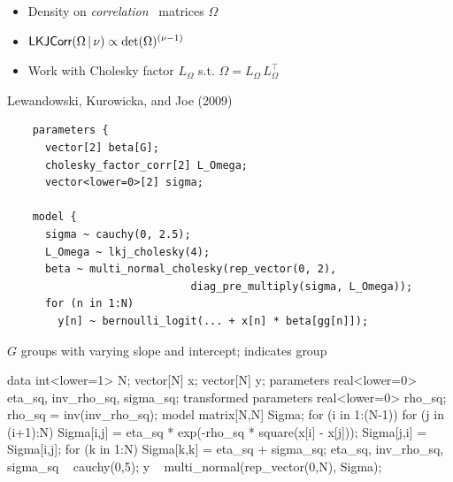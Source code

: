 \documentclass[10pt]{report}
\begin{document}
%
\begin{itemize}
\item Density on \emph{correlation} \ matrices $\Omega$
%
\item $\text{\sf LKJCorr}(\Omega \, | \, \nu)
       \propto \mbox{det}(\Omega)^{(\nu - 1)}$
%
\item Work with Cholesky factor $L_{\Omega}$ s.t. $\Omega = L_{\Omega} \, L_{\Omega}^{\top}$
%
\end{itemize}
\vfill
\hfill {\footnotesize Lewandowski, Kurowicka, and Joe (2009)}


%
\vspace*{-4pt}
{\footnotesize
\begin{Verbatim}
    parameters {
      vector[2] beta[G];
      cholesky_factor_corr[2] L_Omega;
      vector<lower=0>[2] sigma;

    model {
      sigma ~ cauchy(0, 2.5);
      L_Omega ~ lkj_cholesky(4);
      beta ~ multi_normal_cholesky(rep_vector(0, 2),
                             diag_pre_multiply(sigma, L_Omega));
      for (n in 1:N)
        y[n] ~ bernoulli_logit(... + x[n] * beta[gg[n]]);
\end{Verbatim}
}
\vspace*{6pt}
\begin{subitemize}
\item $G$ groups with varying slope and intercept;  indicates group
\end{subitemize}


%
\vspace*{-5pt}
\begin{stancode}
data {
  int<lower=1> N;  vector[N] x; vector[N] y;
} parameters {
  real<lower=0> eta_sq, inv_rho_sq, sigma_sq;
} transformed parameters {
  real<lower=0> rho_sq; rho_sq = inv(inv_rho_sq);
} model {
  matrix[N,N] Sigma;
  for (i in 1:(N-1)) {
    for (j in (i+1):N) {
      Sigma[i,j] = eta_sq * exp(-rho_sq * square(x[i] - x[j]));
      Sigma[j,i] = Sigma[i,j];
  }}
  for (k in 1:N) Sigma[k,k] = eta_sq + sigma_sq;
  eta_sq, inv_rho_sq, sigma_sq ~ cauchy(0,5);
  y ~ multi_normal(rep_vector(0,N), Sigma);
}
\end{stancode}
\end{document}

